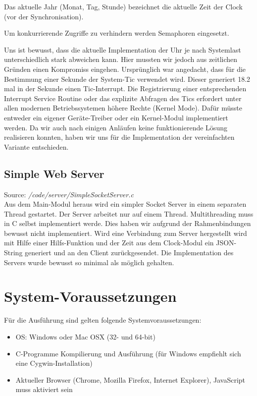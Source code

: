 Das aktuelle Jahr (Monat, Tag, Stunde) bezeichnet die aktuelle Zeit der Clock (vor der Synchronisation).

Um konkurrierende Zugriffe zu verhindern werden Semaphoren eingesetzt.

Uns ist bewusst, dass die aktuelle Implementation der Uhr je nach Systemlast unterschiedlich stark abweichen kann. Hier mussten wir jedoch aus zeitlichen Gründen einen Kompromiss eingehen. Ursprünglich war angedacht, dass für die Bestimmung einer Sekunde der System-Tic verwendet wird. Dieser generiert 18.2 mal in der Sekunde einen  Tic-Interrupt. Die Registrierung einer entsprechenden Interrupt Service Routine oder das explizite Abfragen des Tics erfordert unter allen modernen Betriebssystemen höhere Rechte (Kernel Mode). Dafür müsste entweder ein eigener Geräte-Treiber oder ein Kernel-Modul implementiert werden. Da wir auch nach einigen Anläufen keine funktionierende Lösung realisieren konnten, haben wir uns für die Implementation der vereinfachten Variante entschieden.

\subsection{Simple Web Server}
Source: \textit{/code/server/SimpleSocketServer.c}\\
Aus dem Main-Modul heraus wird ein simpler Socket Server in einem separaten Thread gestartet. Der Server arbeitet nur auf einem Thread. Multithreading muss in C selbst implementiert werde. Dies haben wir aufgrund der Rahmenbindungen bewusst nicht implementiert. Wird eine Verbindung zum Server hergestellt wird mit Hilfe einer Hilfs-Funktion und der Zeit aus dem Clock-Modul ein JSON-String generiert und an den Client zurückgesendet. Die Implementation des Servers wurde bewusst so minimal als möglich gehalten.

\section{System-Voraussetzungen}
Für die Ausführung sind gelten folgende Systemvoraussetzungen:

\begin{itemize}
\item OS: Windows oder Mac OSX (32- und 64-bit)
\item C-Programme Kompilierung und Ausführung (für Windows empfiehlt sich eine Cygwin-Installation)
\item Aktueller Browser (Chrome, Mozilla Firefox, Internet Explorer), JavaScript muss aktiviert sein
\end{itemize}

